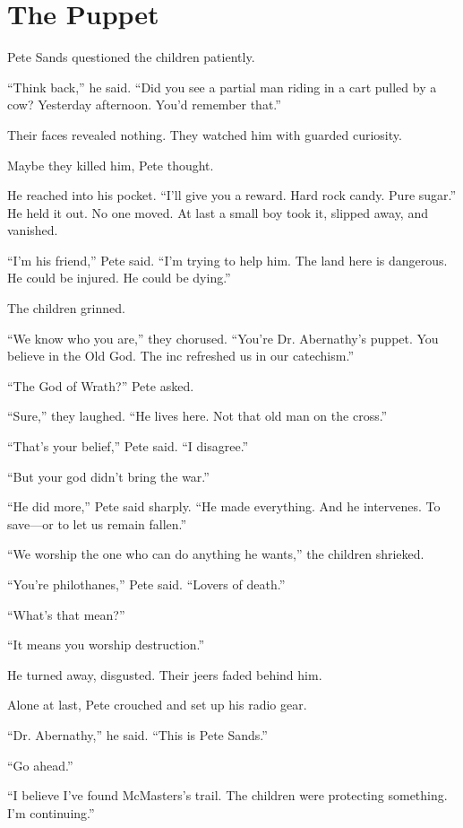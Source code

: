\chapter{The Puppet}

Pete Sands questioned the children patiently.

“Think back,” he said. “Did you see a partial man riding in a cart pulled by a cow? Yesterday afternoon. You’d remember that.”

Their faces revealed nothing. They watched him with guarded curiosity.

Maybe they killed him, Pete thought.

He reached into his pocket. “I’ll give you a reward. Hard rock candy. Pure sugar.” He held it out. No one moved. At last a small boy took it, slipped away, and vanished.

“I’m his friend,” Pete said. “I’m trying to help him. The land here is dangerous. He could be injured. He could be dying.”

The children grinned.

“We know who you are,” they chorused. “You’re Dr. Abernathy’s puppet. You believe in the Old God. The inc refreshed us in our catechism.”

“The God of Wrath?” Pete asked.

“Sure,” they laughed. “He lives here. Not that old man on the cross.”

“That’s your belief,” Pete said. “I disagree.”

“But your god didn’t bring the war.”

“He did more,” Pete said sharply. “He made everything. And he intervenes. To save—or to let us remain fallen.”

“We worship the one who can do anything he wants,” the children shrieked.

“You’re philothanes,” Pete said. “Lovers of death.”

“What’s that mean?”

“It means you worship destruction.”

He turned away, disgusted. Their jeers faded behind him.

Alone at last, Pete crouched and set up his radio gear.

“Dr. Abernathy,” he said. “This is Pete Sands.”

“Go ahead.”

“I believe I’ve found McMasters’s trail. The children were protecting something. I’m continuing.”

